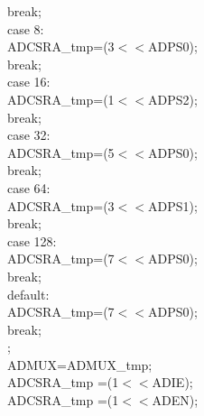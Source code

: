 \documentclass[titlepage, a4paper, 10pt, reqno, openany]{report}
\begin{document}
\begin{minipage}[t]{.3\linewidth}
\hspace*{1.5cm}			break; \\
\hspace*{1cm}		case 8: \\
\hspace*{1.5cm}			ADCSRA\_tmp=(3$<<$ADPS0); \\
\hspace*{1.5cm}			break; \\
\hspace*{1cm}		case 16: \\
\hspace*{1.5cm}			ADCSRA\_tmp=(1$<<$ADPS2); \\
\hspace*{1.5cm}			break; \\
\hspace*{1cm}		case 32: \\
\hspace*{1.5cm}			ADCSRA\_tmp=(5$<<$ADPS0); \\
\hspace*{1.5cm}			break; \\
\hspace*{1cm}		case 64: \\
\hspace*{1.5cm}			ADCSRA\_tmp=(3$<<$ADPS1); \\
\hspace*{1.5cm}			break; \\
\hspace*{1cm}		case 128: \\
\hspace*{1.5cm}			ADCSRA\_tmp=(7$<<$ADPS0); \\
\hspace*{1.5cm}			break; \\
\hspace*{1cm}		default: \\
\hspace*{1.5cm}			ADCSRA\_tmp=(7$<<$ADPS0); \\
\hspace*{1.5cm}			break; \\
\hspace*{.5cm}	\textbraceright ; \\
\hspace*{.5cm}	ADMUX=ADMUX\_tmp; \\
\hspace*{.5cm}	ADCSRA\_tmp \textbar =(1$<<$ADIE); \\
\hspace*{.5cm}	ADCSRA\_tmp \textbar =(1$<<$ADEN); \\

\end{minipage}
\end{document}
